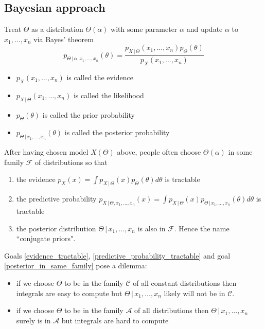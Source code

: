\documentclass[14pt, reqno]{amsart}
\theoremstyle{definition}
\begin{document}
\subsection{Bayesian approach} Treat $\Theta$ as a distribution $\Theta(\alpha)$ with some parameter $\alpha$ and update $\alpha$ to $x_1, \dots, x_n$ via Bayes' theorem
\vspace{10pt}
\begin{equation}\label{bayes_theorem}
p_{\Theta \,|\, \alpha, x_1, \dots, x_n}(\theta) = \frac{p_{X \,|\, \Theta}(x_1, \dots, x_n) p_{\Theta}(\theta)}{p_X(x_1, \dots, x_n)}
\end{equation}
\vspace{10pt}
\begin{itemize}
\item $p_X(x_1, \dots, x_n)$ is called the evidence
\item $p_{X \,|\, \Theta}(x_1, \dots, x_n)$ is called the likelihood
\item $ p_{\Theta}(\theta)$ is called the prior probability
\item $p_{\Theta \,|\, x_1, \dots, x_n}(\theta)$ is called the posterior probability
\end{itemize}
\vspace{20pt}

After having chosen model $X(\Theta)$ above, people often choose $\Theta(\alpha)$ in some family $\mathcal{F}$ of distributions so that
\begin{enumerate}[1.]
\item \label{evidence_tractable} the evidence $p_X(x) = \int p_{X \,|\, \Theta}(x) p_{\Theta}(\theta) d \theta$ is tractable
\item \label{predictive_probability_tractable} the predictive probability $p_{X \,|\, \Theta, x_1, \dots, x_n} (x) = \int p_{X \,|\, \Theta}(x) p_{\Theta \,|\, x_1, \dots, x_n}(\theta) d \theta$ is tractable
\item \label{posterior_in_same_family} the posterior distribution $\Theta \,|\, x_1, \dots, x_n$ is also in $\mathcal{F}$. Hence the name ``conjugate priors".
\end{enumerate}
\vfill
\pagebreak

Goals \ref{evidence_tractable}, \ref{predictive_probability_tractable} and goal \ref{posterior_in_same_family} pose a dilemma:
\begin{itemize}
\item if we choose $\Theta$ to be in the family $\mathcal{C}$ of all constant distributions then integrals are easy to compute but $\Theta \,|\, x_1, \dots, x_n$ likely will not be in $\mathcal{C}$.
\item if we choose $\Theta$ to be in the family $\mathcal{A}$ of all distributions then $\Theta \,|\, x_1, \dots, x_n$ surely is in $\mathcal{A}$ but integrals are hard to compute
\end{itemize}
\vspace{20pt}
\end{document}
